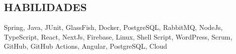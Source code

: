 \begin{framed}
    \section{HABILIDADES}
    Spring, Java, JUnit, GlassFish, Docker, PostgreSQL, RabbitMQ, NodeJs, TypeScript, React, NextJs, Firebase, Linux, Shell Script, WordPress, Scrum, GitHub, GitHub Actions, Angular, PostgreSQL, Cloud 
  \end{framed}
